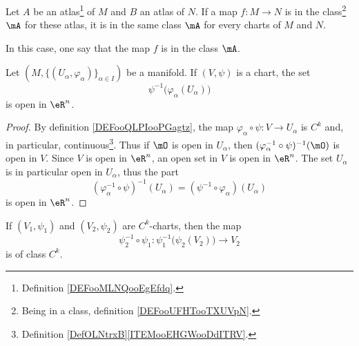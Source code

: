 \begin{propositionDef}          \label{PROPooUFGQooACIjVL}
	Let \( A\) be an atlas\footnote{Definition \ref{DEFooMLNQooEgEfdq}.} of \( M\) and \( B\) an atlas of \( N\). If a map \( f\colon M\to N\) is in the class\footnote{Being in a class, definition \ref{DEFooUFHTooTXUVpN}.} \( \mA\) for these atlas, it is in the same class \( \mA\) for every charts of \( M\) and \( N\).

	In this case, one say that the map \( f\) is in the class \( \mA\).
\end{propositionDef}

\begin{lemma}       \label{LEMooGAMVooIWUzmy}
	Let \( (M,\{ (U_{\alpha}, \varphi_{\alpha}) \}_{\alpha\in I}) \) be a manifold. If \( (V,\psi)\) is a chart, the set
	\begin{equation}
		\psi^{-1}\big(\varphi_{\alpha}(U_{\alpha})\big)
	\end{equation}
	is open in \(\eR^n\).
\end{lemma}

\begin{proof}
	By definition \ref{DEFooQLPIooPGagtz}, the map \( \varphi_{\alpha}\circ \psi \colon V\to U_{\alpha}\) is \( C^k\) and, in particular, continuous\footnote{Definition \ref{DefOLNtrxB}\ref{ITEMooEHGWooDdITRV}.}. Thus if \( \mO\) is open in \( U_{\alpha}\), then \( (\varphi_{\alpha}^{-1}\circ\psi)^{-1}(\mO)\) is open in \( V\). Since \( V\) is open in \( \eR^n\), an open set in \( V\) is open in \( \eR^n\). The set \( U_{\alpha}\) is in particular open in \( U_{\alpha}\), thus the part
	\begin{equation}
		(\varphi_{\alpha}^{-1}\circ \psi)^{-1}(U_{\alpha})=(\psi^{-1}\circ\varphi_{\alpha})(U_{\alpha})
	\end{equation}
	is open in \( \eR^n\).
\end{proof}

\begin{proposition}      \label{PROPooUDVFooEJeluM}
	If \( (V_1,\psi_1)\) and \( (V_2,\psi_2)\) are \( C^k\)-charts, then the map
	\begin{equation}
		\psi_2^{-1}\circ \psi_1\colon \psi_1^{-1}\big( \psi_2(V_2) \big)\to V_2
	\end{equation}
	is of class \( C^k\).
\end{proposition}

